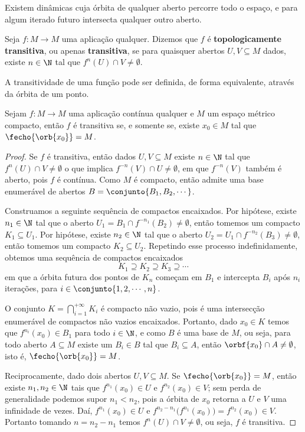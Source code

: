 Existem dinâmicas cuja órbita de qualquer aberto percorre todo o espaço, e para algum iterado futuro intersecta qualquer outro aberto.

\begin{definicao} Seja $f:M\to M$ uma aplicação qualquer. Dizemos que $f$ é \textbf{topologicamente transitiva}, ou apenas \textbf{transitiva}, se para quaisquer abertos $U,V\subseteq M$ dados, existe $n\in\N$ tal que $f^n(U)\cap V\neq\emptyset$.
\end{definicao}

A transitividade de uma função pode ser definida, de forma equivalente, através da órbita de um ponto.

\begin{proposicao}\label{minimaltransitiva} Sejam $f:M\to M$ uma aplicação contínua qualquer e $M$ um espaço métrico compacto, então $f$ é transitiva se, e somente se, existe $x_0\in M$ tal que $\fecho{\orb{x_0}}=M$.
\end{proposicao}

\begin{proof} Se $f$ é transitiva, então dados $U,V\subseteq M$ existe $n\in\N$ tal que $f^n(U)\cap V\neq\emptyset$ o que implica $f^{-n}(V)\cap U\neq\emptyset$, em que $f^{-n}(V)$ também é aberto, pois $f$ é contínua. Como $M$ é compacto, então admite uma base enumerável de abertos $B=\conjunto{B_1,B_2,\cdots}$.

Construamos a seguinte sequência de compactos encaixados. Por hipótese, existe $n_1\in\N$ tal que o aberto $U_1=B_1\cap f^{-n_1}(B_2)\neq\emptyset$, então tomemos um compacto $K_1\subseteq U_1$. Por hipótese, existe $n_2\in\N$ tal que o aberto $U_2=U_1\cap f^{-n_2}(B_3)\neq\emptyset$, então tomemos um compacto $K_2\subseteq U_2$. Repetindo esse processo indefinidamente, obtemos uma sequência de compactos encaixados $$K_1\supseteq K_2\supseteq K_3\supseteq\cdots$$ em que a órbita futura dos pontos de $K_n$ começam em $B_1$ e intercepta $B_i$ após $n_i$ iterações, para $i\in\conjunto{1,2,\cdots,n}$.

O conjunto $K=\bigcap_{i=1}^{+\infty}K_i$ é compacto não vazio, pois é uma intersecção enumerável de compactos não vazios encaixados. Portanto, dado $x_0\in K$ temos que $f^{n_i}(x_0)\in B_1$ para todo $i\in\N$, e como $B$ é uma base de $M$, ou seja, para todo aberto $A\subseteq M$ existe um $B_i\in B$ tal que $B_i\subseteq A$, então $\orbf{x_0}\cap A\neq\emptyset$, isto é, $\fecho{\orb{x_0}}=M$.

Reciprocamente, dado dois abertos $U,V\subseteq M$. Se $\fecho{\orb{x_0}}=M$, então existe $n_1,n_2\in\N$ tais que $f^{n_1}(x_0)\in U$ e $f^{n_2}(x_0)\in V$; sem perda de generalidade podemos supor $n_1<n_2$, pois a órbita de $x_0$ retorna a $U$ e $V$ uma infinidade de vezes. Daí, $f^{n_1}(x_0)\in U$ e $f^{n_2-n_1}\big(f^{n_1}(x_0)\big)=f^{n_2}(x_0)\in V$. Portanto tomando $n=n_2-n_1$ temos $f^n(U)\cap V\neq\emptyset$, ou seja, $f$ é transitiva.
\end{proof}


